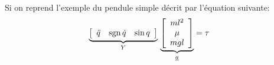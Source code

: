 \begin{example}

Si on reprend l'exemple du pendule simple décrit par l'équation suivante:
\begin{align}
\underbrace{
\left[
\begin{array}{ccc}
   \ddot{q}  &  \operatorname{sgn}{\dot{q}} & \sin q
\end{array} \right]
}_{Y}
\,
\underbrace{
\left[
\begin{array}{c}
 ml^2 \\ \mu \\ mgl
\end{array}\right]
}_{\underline{a}}
&= \tau
\end{align}


\end{example}
